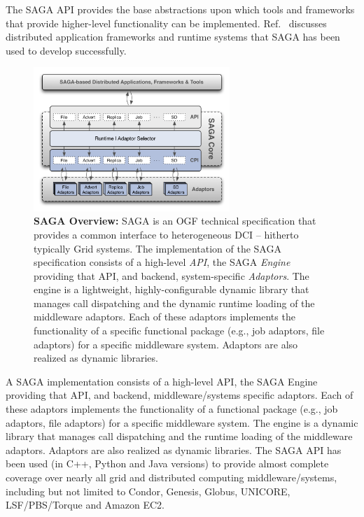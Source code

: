 \documentclass[]{svjour3}
\begin{document}
The SAGA API provides the base abstractions upon which tools and
frameworks that provide higher-level functionality can be
implemented. Ref.~\cite{saga_url} discusses distributed application
frameworks and runtime systems that SAGA has been used to develop
successfully. 


\begin{figure}[t]
  \centering \includegraphics[width=0.66\textwidth]{figures/saga-architecture-1.png}
\caption{\textbf{SAGA Overview: } SAGA is an OGF technical
 specification that provides a common interface to heterogeneous DCI
 -- hitherto typically Grid systems. The implementation of the
 SAGA\cite{saga_url} specification consists of a high-level {\it
  API}, the SAGA {\it Engine} providing that API, and backend,
 system-specific {\it Adaptors}. The engine is a lightweight,
 highly-configurable dynamic library that manages call dispatching
 and the dynamic runtime loading of the middleware adaptors. Each of
 these adaptors implements the functionality of a specific functional
 package (e.g., job adaptors, file adaptors) for a specific
 middleware system. Adaptors are also realized as dynamic libraries.}
 \label{fig:saga-overview}
\end{figure}

A SAGA implementation consists of a high-level API, the SAGA
Engine providing that API, and backend, middleware/systems specific
adaptors. Each of these adaptors implements the functionality of
a functional package (e.g., job adaptors, file adaptors) for a
specific middleware system. The engine is a dynamic library that
manages call dispatching and the runtime loading of the middleware
adaptors. Adaptors are also realized as dynamic libraries. The SAGA
API has been used (in C++, Python and Java versions) to provide almost
complete coverage over nearly all grid and distributed computing
middleware/systems, including but not limited to Condor, Genesis,
Globus, UNICORE, LSF/PBS/Torque and Amazon EC2.
\end{document}
